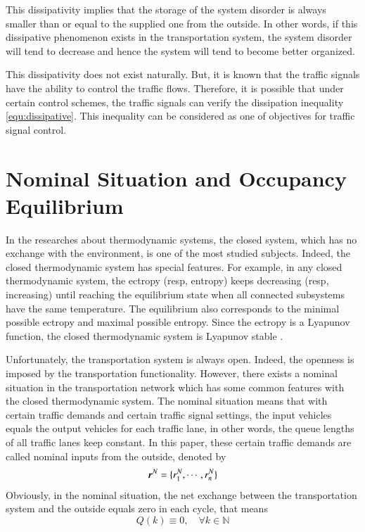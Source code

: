 \documentclass[preprint,authoryear,12pt]{elsarticle}
\renewcommand{\vec}[1]{\mbox{\boldmath$#1$}}
\begin{document}
This dissipativity implies that the storage of the system disorder is always smaller than or equal to the supplied one from the outside. In other words, if this dissipative phenomenon exists in the transportation system, the system disorder will tend to decrease and hence the system will tend to become better organized.

This dissipativity does not exist naturally. But, it is known that the traffic signals have the ability to control the traffic flows. Therefore, it is possible that under certain control schemes, the traffic signals can verify the dissipation inequality \eqref{equ:dissipative}. This inequality can be considered as one of objectives for traffic signal control.

\section{Nominal Situation and Occupancy Equilibrium}

In the researches about thermodynamic systems, the closed system, which has no exchange with the environment, is one of the most studied subjects. Indeed, the closed thermodynamic system has special features. For example, in any closed thermodynamic system, the ectropy (resp, entropy) keeps decreasing (resp, increasing) until reaching the equilibrium state when all connected subsystems have the same temperature. The equilibrium also corresponds to the minimal possible ectropy and maximal possible entropy. Since the ectropy is a Lyapunov function, the closed thermodynamic system is Lyapunov stable \citep{haddad_thermodynamic_2005}.

Unfortunately, the transportation system is always open. Indeed, the openness is imposed by the transportation functionality. However, there exists a nominal situation \citep{diakaki_multivariable_2002} in the transportation network which has some common features with the closed thermodynamic system. The nominal situation means that with certain traffic demands and certain traffic signal settings, the input vehicles equals the output vehicles for each traffic lane, in other words, the queue lengths of all traffic lanes keep constant. In this paper, these certain traffic demands are called nominal inputs from the outside, denoted by
$$\vec{r}^N=\{r_1^N,\cdots,r_n^N\}$$
Obviously, in the nominal situation, the net exchange between the transportation system and the outside equals zero in each cycle, that means
\begin{equation}\label{equ:nominal_exchange}
Q(k)\equiv 0, \quad \forall k\in\mathbb{N}
\end{equation}
\end{document}
